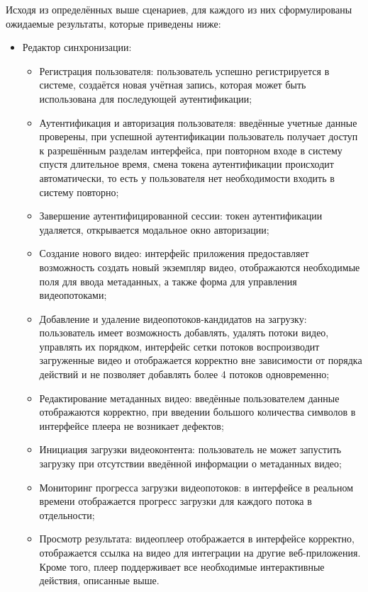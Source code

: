 	Исходя из определённых выше сценариев, для каждого из них сформулированы ожидаемые результаты, которые приведены ниже:

	\begin{itemize}[label=$\bullet$]
		\item Редактор синхронизации:
		\begin{itemize}[label=$\circ$]
			\item Регистрация пользователя: пользователь успешно регистрируется в системе, создаётся новая учётная запись, которая может быть использована для последующей аутентификации;
			\item Аутентификация и авторизация пользователя: введённые учетные данные проверены, при успешной аутентификации пользователь получает доступ к разрешённым разделам интерфейса, при повторном входе в систему спустя длительное время, смена токена аутентификации происходит автоматически, то есть у пользователя нет необходимости входить в систему повторно;
			\item Завершение аутентифицированной сессии: токен аутентификации удаляется, открывается модальное окно авторизации;
			\item Создание нового видео: интерфейс приложения предоставляет возможность создать новый экземпляр видео, отображаются необходимые поля для ввода метаданных, а также форма для управления видеопотоками;
			\item Добавление и удаление видеопотоков-кандидатов на загрузку: пользователь имеет возможность добавлять, удалять потоки видео, управлять их порядком, интерфейс сетки потоков воспроизводит загруженные видео и отображается корректно вне зависимости от порядка действий и не позволяет добавлять более 4 потоков одновременно;
			\item Редактирование метаданных видео: введённые пользователем данные отображаются корректно, при введении большого количества символов в интерфейсе плеера не возникает дефектов;
			\item Инициация загрузки видеоконтента: пользователь не может запустить загрузку при отсутствии введённой информации о метаданных видео;
			\item Мониторинг прогресса загрузки видеопотоков: в интерфейсе в реальном времени отображается прогресс загрузки для каждого потока в отдельности;
			\item Просмотр результата: видеоплеер отображается в интерфейсе корректно, отображается ссылка на видео для интеграции на другие веб-приложения. Кроме того, плеер поддерживает все необходимые интерактивные действия, описанные выше.

\end{itemize}
\end{itemize}
